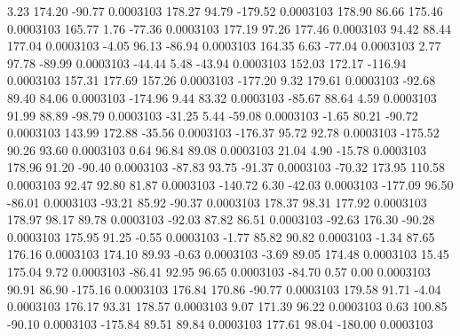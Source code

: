         3.23      174.20      -90.77     0.0003103
      178.27       94.79     -179.52     0.0003103
      178.90       86.66      175.46     0.0003103
      165.77        1.76      -77.36     0.0003103
      177.19       97.26      177.46     0.0003103
       94.42       88.44      177.04     0.0003103
       -4.05       96.13      -86.94     0.0003103
      164.35        6.63      -77.04     0.0003103
        2.77       97.78      -89.99     0.0003103
      -44.44        5.48      -43.94     0.0003103
      152.03      172.17     -116.94     0.0003103
      157.31      177.69      157.26     0.0003103
     -177.20        9.32      179.61     0.0003103
      -92.68       89.40       84.06     0.0003103
     -174.96        9.44       83.32     0.0003103
      -85.67       88.64        4.59     0.0003103
       91.99       88.89      -98.79     0.0003103
      -31.25        5.44      -59.08     0.0003103
       -1.65       80.21      -90.72     0.0003103
      143.99      172.88      -35.56     0.0003103
     -176.37       95.72       92.78     0.0003103
     -175.52       90.26       93.60     0.0003103
        0.64       96.84       89.08     0.0003103
       21.04        4.90      -15.78     0.0003103
      178.96       91.20      -90.40     0.0003103
      -87.83       93.75      -91.37     0.0003103
      -70.32      173.95      110.58     0.0003103
       92.47       92.80       81.87     0.0003103
     -140.72        6.30      -42.03     0.0003103
     -177.09       96.50      -86.01     0.0003103
      -93.21       85.92      -90.37     0.0003103
      178.37       98.31      177.92     0.0003103
      178.97       98.17       89.78     0.0003103
      -92.03       87.82       86.51     0.0003103
      -92.63      176.30      -90.28     0.0003103
      175.95       91.25       -0.55     0.0003103
       -1.77       85.82       90.82     0.0003103
       -1.34       87.65      176.16     0.0003103
      174.10       89.93       -0.63     0.0003103
       -3.69       89.05      174.48     0.0003103
       15.45      175.04        9.72     0.0003103
      -86.41       92.95       96.65     0.0003103
      -84.70        0.57        0.00     0.0003103
       90.91       86.90     -175.16     0.0003103
      176.84      170.86      -90.77     0.0003103
      179.58       91.71       -4.04     0.0003103
      176.17       93.31      178.57     0.0003103
        9.07      171.39       96.22     0.0003103
        0.63      100.85      -90.10     0.0003103
     -175.84       89.51       89.84     0.0003103
      177.61       98.04     -180.00     0.0003103

